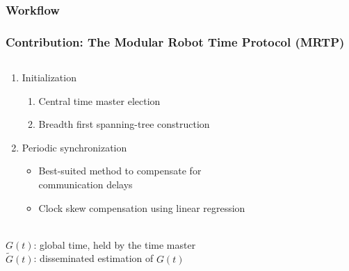 \subsubsection{Workflow}
\begin{frame} \frametitle{Contribution: The Modular Robot Time Protocol (MRTP)}
\begin{center}
    \begin{columns}[t]
      \begin{column}{.80\textwidth}
		\begin{enumerate}
			\item Initialization
			\begin{enumerate}
			\item Central time master election
			\item Breadth first spanning-tree construction
			\end{enumerate}
			\item Periodic synchronization
			\begin{itemize}
				\item Best-suited method to compensate for\\communication delays
				\item Clock skew compensation using linear regression
			\end{itemize}
		\end{enumerate}
      
      ~\\
      $G(t)$: global time, held by the time master\\
      $\tilde{G}(t)$: disseminated estimation of $G(t)$
      

\end{column}
\end{columns}
\end{center}
\end{frame}
